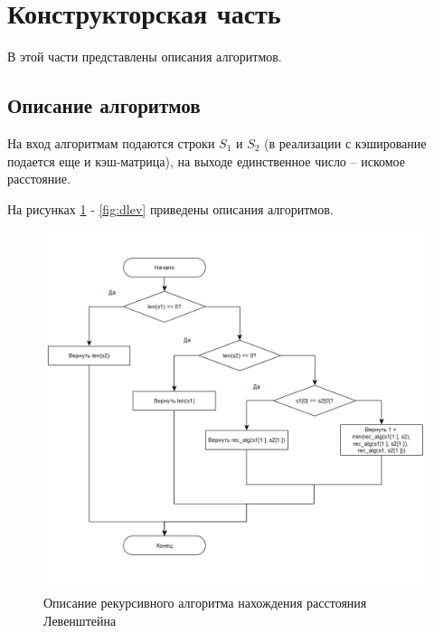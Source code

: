 \documentclass{article}
\begin{document}
\clearpage\section{Конструкторская часть}
В этой части представлены описания алгоритмов.

\subsection{Описание алгоритмов}
На вход алгоритмам подаются строки $S_{1}$ и $S_{2}$ (в реализации с кэширование подается еще и кэш-матрица), на 
выходе единственное число -- искомое расстояние.

На рисунках \ref{fig:rec_lev} - \ref{fig:dlev} приведены описания алгоритмов.

\begin{figure}[h]
	\centering
	\includegraphics[scale=0.7]{tools/alg_1.png}
	\caption{Описание рекурсивного алгоритма нахождения расстояния Левенштейна}
	\label{fig:rec_lev}
\end{figure}
\end{document}
